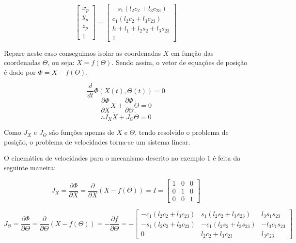 \documentclass[12pt,a4paper]{article}
\begin{document}
$$
\begin{bmatrix}
x_p \\
y_p \\
z_p \\
1
\end{bmatrix}
=
\begin{bmatrix}
-s_1 (l_2 c_2 + l_3 c_{23})  \\
c_1 (l_2 c_2 + l_3 c_{23}) \\
h + l_1 + l_2 s_2 + l_3 s_{23} \\
1
\end{bmatrix}
$$

Repare neste caso conseguimos isolar as coordenadas $X$ em função das coordenadas $\Theta$, ou seja: $X = f(\Theta)$. Sendo assim, o vetor de equações de posição é dado por $\Phi = X - f(\Theta)$. \\


$$ \frac{d}{dt} \Phi(X(t), \Theta(t)) = 0 $$
$$ \frac{\partial \Phi}{\partial X} \dot{X} + \frac{\partial \Phi}{\partial \Theta} \dot{\Theta} = 0 $$
$$ \therefore J_X \dot{X} + J_\Theta \dot{\Theta} = 0 $$

Como $J_X$ e $J_\Theta$ são funções apenas de $X$ e $\Theta$, tendo resolvido o problema de posição, o problema de velocidades torna-se um sistema linear. \\


O cinemática de velocidades para o mecanismo descrito no exemplo 1 é feita da seguinte maneira:

$$ J_X = \frac{\partial \Phi}{\partial X} = \frac{\partial}{\partial X} ( X - f(\Theta) ) = I = \begin{bmatrix}
1 & 0 & 0 \\
0 & 1 & 0 \\
0 & 0 & 1
\end{bmatrix} $$

$$ J_\Theta = \frac{\partial \Phi}{\partial \Theta} = \frac{\partial}{\partial \Theta} ( X - f(\Theta) ) = - \frac{\partial f}{\partial \Theta} = -\begin{bmatrix}
-c_1 (l_2 c_2 + l_3 c_{23}) & s_1 (l_2 s_2 + l_3 s_{23}) &  l_3 s_1 s_{23} \\
-s_1 (l_2 c_2 + l_3 c_{23}) & -c_1 (l_2 s_2 + l_3 s_{23}) & - l_3 c_1 s_{23} \\
0 & l_2 c_2 + l_3 c_{23} & l_3 c_{23}
\end{bmatrix}  $$
\end{document}
